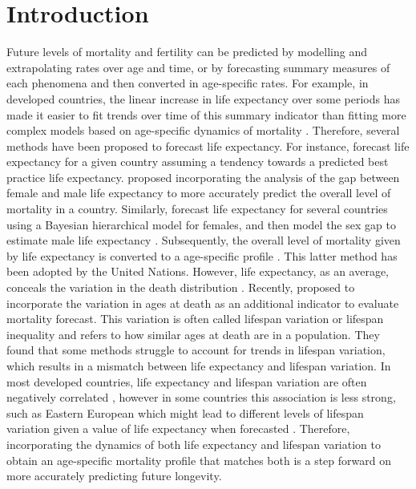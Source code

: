 \documentclass[a4paper,twoside, openright, 12pt, leqno]{article}
\begin{document}
\section{Introduction}
Future levels of mortality and fertility can be predicted by modelling and extrapolating rates over age and time, or by forecasting summary measures of each phenomena and then converted in age-specific rates. For example, in developed countries, the linear increase in life expectancy over some periods has made it easier to fit trends over time of this summary indicator than fitting more complex models based on age-specific dynamics of mortality \citep{White200259}. Therefore, several methods have been proposed to forecast life expectancy. For instance, \citet{torri2012forecasting} forecast life expectancy for a given country assuming a tendency towards a predicted best practice life expectancy. \citet{pascariu2018double} proposed incorporating the analysis of the gap between female and male life expectancy to more accurately predict the overall level of mortality in a country. Similarly, \citet{Raftery2013} forecast life expectancy for several countries using a Bayesian hierarchical model for females, and then model the sex gap to estimate male life expectancy \citep{raftery2014joint}. Subsequently, the overall level of mortality given by life expectancy is converted to a age-specific profile \citep{vsevvcikova2016age}. This latter method has been adopted by the United Nations. However, life expectancy, as an average, conceals the variation in the death distribution \citep{van2018case}. Recently, \citet{bohk2017lifespan} proposed to incorporate the variation in ages at death as an additional indicator to evaluate mortality forecast. This variation is often called lifespan variation or lifespan inequality and refers to how similar ages at death are in a population.
They found that some methods struggle to account for trends in lifespan variation, which results in a mismatch between life expectancy and lifespan variation. In most developed countries, life expectancy and lifespan variation are often negatively correlated \citep{Smits2009,Vaupel2011,colchero2016emergence}, however in some countries this association is less strong, such as Eastern European which might lead to different levels of lifespan variation given a value of life expectancy when forecasted \citep{Aburto2018Eastern}. Therefore, incorporating the dynamics of both life expectancy and lifespan variation to obtain an age-specific mortality profile that matches both is a step forward on more accurately predicting future longevity.
\end{document}
